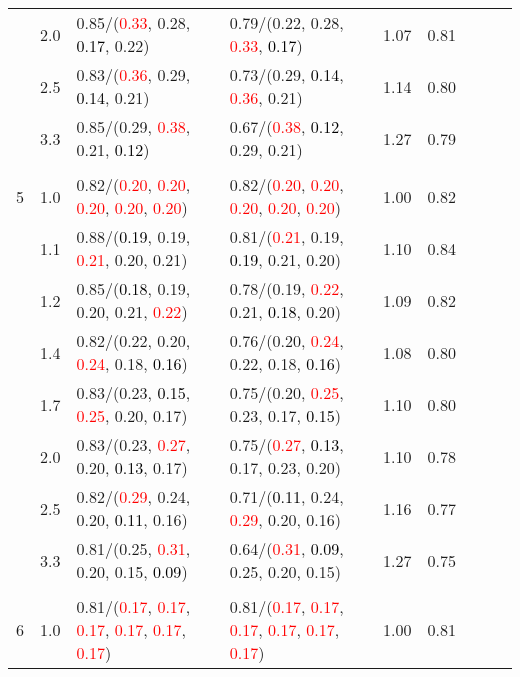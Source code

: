 \documentclass[10pt,a4paper]{report}
\begin{document}
\begin{table}[!htbp]
\begin{center}
{\begin{tabular}{ccllccccc}
			&2.0&0.85/(\textcolor{red}{0.33}, 0.28, \textcolor{black}{0.17}, 0.22)&0.79/(0.22, 0.28, \textcolor{red}{0.33}, \textcolor{black}{0.17})&1.07&0.81\\
			&2.5&0.83/(\textcolor{red}{0.36}, 0.29, \textcolor{black}{0.14}, 0.21)&0.73/(0.29, \textcolor{black}{0.14}, \textcolor{red}{0.36}, 0.21)&1.14&0.80\\
			&3.3&0.85/(0.29, \textcolor{red}{0.38}, 0.21, \textcolor{black}{0.12})&0.67/(\textcolor{red}{0.38}, \textcolor{black}{0.12}, 0.29, 0.21)&1.27&0.79\\
			&&&&\\
			5			&1.0&0.82/(\textcolor{red}{0.20}, \textcolor{red}{0.20}, \textcolor{red}{0.20}, \textcolor{red}{0.20}, \textcolor{red}{0.20})&0.82/(\textcolor{red}{0.20}, \textcolor{red}{0.20}, \textcolor{red}{0.20}, \textcolor{red}{0.20}, \textcolor{red}{0.20})&1.00&0.82\\
			&1.1&0.88/(\textcolor{black}{0.19}, 0.19, \textcolor{red}{0.21}, 0.20, 0.21)&0.81/(\textcolor{red}{0.21}, 0.19, \textcolor{black}{0.19}, 0.21, 0.20)&1.10&0.84\\
			&1.2&0.85/(\textcolor{black}{0.18}, 0.19, 0.20, 0.21, \textcolor{red}{0.22})&0.78/(0.19, \textcolor{red}{0.22}, 0.21, \textcolor{black}{0.18}, 0.20)&1.09&0.82\\
			&1.4&0.82/(0.22, 0.20, \textcolor{red}{0.24}, 0.18, \textcolor{black}{0.16})&0.76/(0.20, \textcolor{red}{0.24}, 0.22, 0.18, \textcolor{black}{0.16})&1.08&0.80\\
			&1.7&0.83/(0.23, \textcolor{black}{0.15}, \textcolor{red}{0.25}, 0.20, 0.17)&0.75/(0.20, \textcolor{red}{0.25}, 0.23, 0.17, \textcolor{black}{0.15})&1.10&0.80\\
			&2.0&0.83/(0.23, \textcolor{red}{0.27}, 0.20, \textcolor{black}{0.13}, 0.17)&0.75/(\textcolor{red}{0.27}, \textcolor{black}{0.13}, 0.17, 0.23, 0.20)&1.10&0.78\\
			&2.5&0.82/(\textcolor{red}{0.29}, 0.24, 0.20, \textcolor{black}{0.11}, 0.16)&0.71/(\textcolor{black}{0.11}, 0.24, \textcolor{red}{0.29}, 0.20, 0.16)&1.16&0.77\\
			&3.3&0.81/(0.25, \textcolor{red}{0.31}, 0.20, 0.15, \textcolor{black}{0.09})&0.64/(\textcolor{red}{0.31}, \textcolor{black}{0.09}, 0.25, 0.20, 0.15)&1.27&0.75\\
			&&&&\\
			6			&1.0&0.81/(\textcolor{red}{0.17}, \textcolor{red}{0.17}, \textcolor{red}{0.17}, \textcolor{red}{0.17}, \textcolor{red}{0.17}, \textcolor{red}{0.17})&0.81/(\textcolor{red}{0.17}, \textcolor{red}{0.17}, \textcolor{red}{0.17}, \textcolor{red}{0.17}, \textcolor{red}{0.17}, \textcolor{red}{0.17})&1.00&0.81\\

\end{tabular}}
\end{center}
\end{table}
\end{document}
